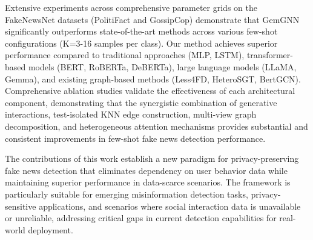 
Extensive experiments across comprehensive parameter grids on the FakeNewsNet datasets (PolitiFact and GossipCop) demonstrate that GemGNN significantly outperforms state-of-the-art methods across various few-shot configurations (K=3-16 samples per class). Our method achieves superior performance compared to traditional approaches (MLP, LSTM), transformer-based models (BERT, RoBERTa, DeBERTa), large language models (LLaMA, Gemma), and existing graph-based methods (Less4FD, HeteroSGT, BertGCN). Comprehensive ablation studies validate the effectiveness of each architectural component, demonstrating that the synergistic combination of generative interactions, test-isolated KNN edge construction, multi-view graph decomposition, and heterogeneous attention mechanisms provides substantial and consistent improvements in few-shot fake news detection performance.


The contributions of this work establish a new paradigm for privacy-preserving fake news detection that eliminates dependency on user behavior data while maintaining superior performance in data-scarce scenarios. The framework is particularly suitable for emerging misinformation detection tasks, privacy-sensitive applications, and scenarios where social interaction data is unavailable or unreliable, addressing critical gaps in current detection capabilities for real-world deployment.

\EndAbstract

